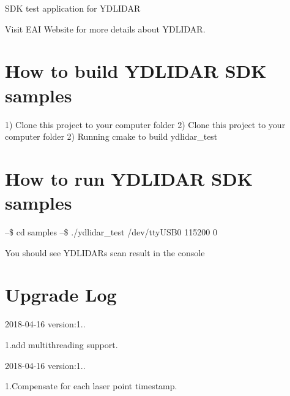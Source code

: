 S\+DK test application for Y\+D\+L\+I\+D\+AR

Visit E\+AI Website for more details about Y\+D\+L\+I\+D\+AR.

\section*{How to build Y\+D\+L\+I\+D\+AR S\+DK samples }

1) Clone this project to your computer folder 2) Clone this project to your computer folder 2) Running cmake to build ydlidar\+\_\+test

\section*{How to run Y\+D\+L\+I\+D\+AR S\+DK samples }

--\$ cd samples --\$ ./ydlidar\+\_\+test /dev/tty\+U\+S\+B0 115200 0

You should see Y\+D\+L\+I\+D\+AR\textquotesingle{}s scan result in the console

\section*{Upgrade Log }

2018-\/04-\/16 version\+:1..

1.\+add multithreading support.

2018-\/04-\/16 version\+:1..

1.\+Compensate for each laser point timestamp. 